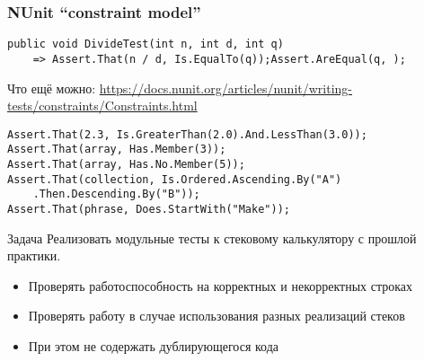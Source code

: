 \documentclass{../../slides-style}
\begin{document}
    \begin{frame}[fragile]
        \frametitle{NUnit \enquote{constraint model}}
        \begin{verbatim}
public void DivideTest(int n, int d, int q)
    => Assert.That(n / d, Is.EqualTo(q));Assert.AreEqual(q, );
        \end{verbatim}
        \vspace{3mm}
        Что ещё можно: \url{https://docs.nunit.org/articles/nunit/writing-tests/constraints/Constraints.html}
        \begin{verbatim}
Assert.That(2.3, Is.GreaterThan(2.0).And.LessThan(3.0));
Assert.That(array, Has.Member(3));
Assert.That(array, Has.No.Member(5));
Assert.That(collection, Is.Ordered.Ascending.By("A")
    .Then.Descending.By("B"));
Assert.That(phrase, Does.StartWith("Make"));
        \end{verbatim}
    \end{frame}

    \begin{frame}{Задача}
        Реализовать модульные тесты к стековому калькулятору с прошлой практики.
        \begin{itemize}
            \item Проверять работоспособность на корректных и некорректных строках
            \item Проверять работу в случае использования разных реализаций стеков
            \item При этом не содержать дублирующегося кода
        \end{itemize} 
    \end{frame}
\end{document}
